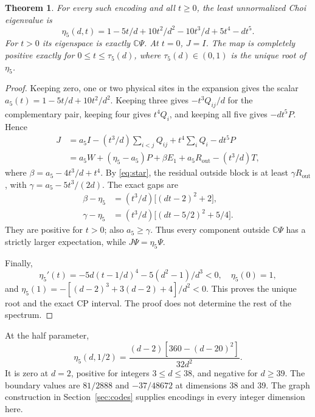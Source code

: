 \documentclass[11pt,a4paper]{article}
\newtheorem{theorem}{Theorem}
\newcommand{\C}{\mathbb C}
\begin{document}
\begin{theorem}\label{thm:five}
For every such encoding and all \(t\ge0\), the least unnormalized Choi eigenvalue is
\begin{equation}\label{eq:eta5}
 \eta_5(d,t)=1-5t/d+10t^2/d^2-10t^3/d+5t^4-dt^5.
\end{equation}
For \(t>0\) its eigenspace is exactly \(\C\Psi\). At \(t=0\), \(J=I\). The map is completely positive exactly for \(0\le t\le\tau_5(d)\), where \(\tau_5(d)\in(0,1)\) is the unique root of \(\eta_5\).
\end{theorem}
\begin{proof}
Keeping zero, one or two physical sites in the expansion gives the scalar
\(a_5(t)=1-5t/d+10t^2/d^2\). Keeping three gives \(-t^3Q_{ij}/d\) for the complementary pair, keeping four gives \(t^4Q_i\), and keeping all five gives \(-dt^5P\). Hence
\begin{align}\label{eq:fiveJ}
 J&=a_5I-(t^3/d)\sum_{i<j}Q_{ij}+t^4\sum_iQ_i-dt^5P\\
  &=a_5W+(\eta_5-a_5)P+\beta E_1+a_5R_{\mathrm{out}}-(t^3/d)T,\nonumber
\end{align}
where \(\beta=a_5-4t^3/d+t^4\). By \eqref{eq:star}, the residual outside block is at least \(\gamma R_{\mathrm{out}}\), with \(\gamma=a_5-5t^3/(2d)\). The exact gaps are
\begin{align*}
 \beta-\eta_5&=(t^3/d)\bigl[(dt-2)^2+2\bigr],\\
 \gamma-\eta_5&=(t^3/d)\bigl[(dt-5/2)^2+5/4\bigr].
\end{align*}
They are positive for \(t>0\); also \(a_5\ge\gamma\). Thus every component outside \(\C\Psi\) has a strictly larger expectation, while \(J\Psi=\eta_5\Psi\).

Finally,
\[
 \eta_5'(t)=-5d(t-1/d)^4-5(d^2-1)/d^3<0,
 \quad \eta_5(0)=1,
\]
and \(\eta_5(1)=-[(d-2)^3+3(d-2)+4]/d^2<0\). This proves the unique root and the exact CP interval. The proof does not determine the rest of the spectrum.
\end{proof}

At the half parameter,
\begin{equation}\label{eq:fiveendpoint}
 \eta_5(d,1/2)=\frac{(d-2)[360-(d-20)^2]}{32d^2}.
\end{equation}
It is zero at \(d=2\), positive for integers \(3\le d\le38\), and negative for \(d\ge39\). The boundary values are \(81/2888\) and \(-37/48672\) at dimensions 38 and 39. The graph construction in Section~\ref{sec:codes} supplies encodings in every integer dimension here.
\end{document}
